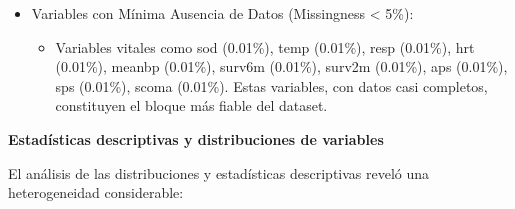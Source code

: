 \begin{itemize}
\begin{itemize}
        un 13.7\% en COPD), sugiriendo una recolección condicionada al protocolo
        clínico.
      \item ph (pH sanguíneo): 25.09\% (2,284 registros). Similar a pafi, con menor
        ausencia en pacientes críticos/respiratorios.
      \item income (Nivel de ingresos): 32.75\%.
      \item adls (Actividades de la vida diaria al seguimiento): 31.49\%. A
        diferencia de adlp, sus patrones de missingness son menos influenciados
        por la gravedad extrema.
    \end{itemize}
  \item Variables con Mínima Ausencia de Datos (Missingness < 5\%):
    \begin{itemize}
      \item Variables vitales como sod (0.01\%), temp (0.01\%), resp (0.01\%), hrt
        (0.01\%), meanbp (0.01\%), surv6m (0.01\%), surv2m (0.01\%), aps (0.01\%),
        sps (0.01\%), scoma (0.01\%). Estas variables, con datos casi completos,
        constituyen el bloque más fiable del dataset.
    \end{itemize}
\end{itemize}

\textbf{Estadísticas descriptivas y distribuciones de variables}

El análisis de las distribuciones y estadísticas descriptivas reveló una
heterogeneidad considerable:


